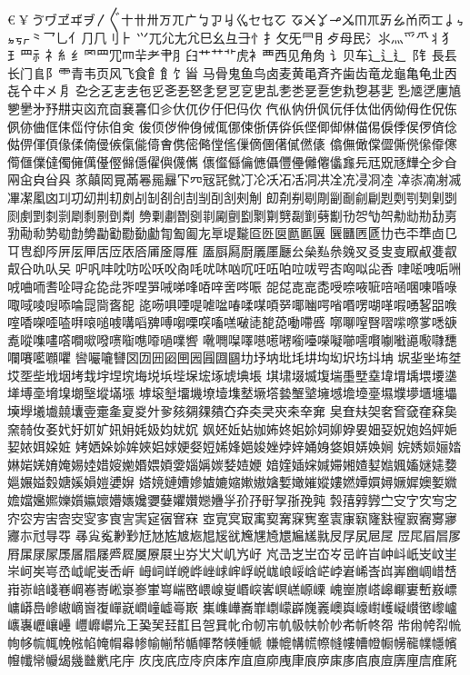 €¥〿ゔヷヹヸヺ〳〴〵〸〹〺ㄪㄫㄬㆠㆡㆢㆣㆤㆥㆦ
ㆧㆨㆩㆪㆫㆬㆭㆮㆯㆰㆱㆲㆳㆴㆵㆶㆷ⺀⺂⺃⺅⺆⺇⺉⺊
⺍⺎⺏⺐⺑⺒⺓⺔⺕⺖⺘⺙⺛⺜⺝⺞⺟⺠⺡⺢⺣⺤⺥⺦⺨
⺩⺫⺬⺭⺯⺰⺱⺲⺴⺵⺸⺹⺺⺼⺽⺾⺿⻀⻁⻂⻃⻄⻅⻆⻇
⻈⻉⻋⻌⻍⻎⻏⻐⻑⻒⻓⻔⻕⻖⻗⻘⻙⻚⻛⻜⻝⻞⻟⻠⻡
⻢⻣⻤⻥⻦⻧⻨⻩⻪⻫⻬⻭⻮⻯⻰⻱⻲⻳㐀㐁㐂㐃㐄㐅㐆
㐇㐈㐉㐊㐋㐌㐍㐎㐏㐐㐑㐒㐓㐔㐕㐖㐗㐘㐙㐚㐛㐜㐝㐞㐟
㐠㐡㐢㐣㐤㐥㐦㐧㐨㐩㐪㐫㐬㐭㐮㐯㐰㐱㐲㐳㐴㐵㐶㐷㐸
㐹㐺㐻㐼㐽㐾㐿㑀㑁㑂㑃㑄㑅㑆㑈㑉㑊㑋㑌㑍㑎㑏㑐㑑㑒
㑓㑔㑕㑖㑗㑘㑙㑚㑛㑜㑝㑞㑟㑠㑡㑢㑣㑤㑥㑦㑧㑨㑩㑪㑫
㑬㑭㑮㑯㑰㑱㑲㑴㑵㑶㑷㑸㑹㑺㑻㑼㑽㑾㑿㒀㒁㒂㒃㒄㒅
㒆㒇㒈㒉㒊㒋㒌㒍㒎㒏㒐㒑㒒㒓㒔㒕㒖㒗㒘㒙㒚㒛㒜㒝㒞
㒟㒠㒡㒢㒣㒤㒥㒦㒧㒨㒩㒪㒫㒬㒭㒮㒯㒰㒱㒲㒳㒴㒵㒶㒷
㒸㒹㒺㒻㒼㒽㒾㒿㓀㓁㓂㓃㓄㓅㓆㓇㓈㓉㓊㓋㓌㓍㓎㓏㓐
㓑㓒㓓㓔㓕㓖㓗㓘㓙㓚㓛㓜㓝㓞㓟㓠㓡㓢㓣㓤㓥㓦㓧㓨㓩
㓪㓫㓬㓭㓮㓯㓰㓱㓲㓳㓴㓵㓶㓷㓸㓹㓺㓻㓼㓽㓾㓿㔀㔁㔂
㔃㔄㔅㔆㔇㔈㔉㔊㔋㔌㔍㔎㔏㔐㔑㔒㔓㔔㔕㔖㔗㔘㔙㔚㔛
㔜㔝㔞㔟㔠㔡㔢㔣㔤㔥㔦㔧㔨㔩㔪㔫㔬㔭㔮㔯㔰㔱㔲㔳㔴
㔵㔶㔷㔸㔹㔺㔻㔼㔽㔾㔿㕀㕁㕂㕃㕄㕅㕆㕇㕈㕉㕊㕋㕌㕍
㕎㕏㕐㕑㕒㕓㕔㕕㕖㕗㕘㕙㕚㕛㕜㕝㕞㕟㕠㕡㕢㕣㕤㕥㕦
㕧㕨㕩㕪㕫㕬㕭㕮㕯㕰㕱㕲㕳㕴㕵㕶㕷㕸㕹㕺㕻㕼㕽㕾㕿
㖀㖁㖂㖃㖄㖅㖆㖇㖈㖉㖊㖋㖌㖍㖎㖏㖐㖑㖒㖓㖔㖕㖖㖗㖘
㖙㖚㖛㖜㖝㖟㖠㖡㖢㖣㖤㖥㖦㖧㖨㖩㖪㖫㖬㖭㖮㖯㖰㖱㖲
㖳㖴㖵㖶㖷㖸㖹㖺㖻㖼㖽㖾㖿㗀㗁㗂㗃㗄㗅㗆㗇㗈㗉㗊㗋
㗌㗍㗎㗏㗐㗑㗒㗓㗔㗕㗖㗗㗘㗙㗚㗛㗜㗝㗞㗟㗠㗡㗢㗣㗤
㗥㗦㗧㗨㗩㗪㗫㗬㗭㗮㗯㗰㗱㗲㗳㗴㗵㗶㗷㗸㗹㗺㗻㗼㗽
㗾㗿㘀㘁㘂㘃㘄㘅㘆㘇㘈㘉㘊㘋㘌㘍㘏㘐㘑㘒㘓㘔㘕㘖㘗
㘘㘙㘛㘜㘝㘞㘟㘠㘡㘢㘣㘤㘥㘦㘧㘨㘩㘪㘫㘬㘭㘮㘯㘰㘱
㘲㘳㘴㘵㘶㘷㘸㘹㘺㘻㘼㘽㘾㘿㙀㙁㙂㙃㙄㙅㙆㙇㙈㙉㙊
㙋㙌㙍㙎㙏㙐㙑㙒㙓㙔㙕㙖㙗㙘㙙㙚㙛㙜㙝㙞㙟㙠㙡㙢㙣
㙤㙥㙦㙧㙨㙩㙪㙫㙬㙭㙮㙯㙰㙱㙲㙳㙴㙵㙶㙷㙸㙹㙺㙻㙼
㙽㙾㙿㚀㚁㚂㚃㚄㚅㚆㚇㚈㚉㚊㚋㚌㚍㚎㚏㚐㚑㚒㚓㚔㚕
㚖㚗㚘㚙㚚㚛㚜㚝㚞㚟㚠㚡㚢㚣㚤㚥㚦㚧㚨㚩㚪㚫㚬㚭㚮
㚯㚰㚱㚲㚳㚴㚵㚶㚷㚸㚹㚺㚻㚼㚽㚾㚿㛀㛁㛂㛃㛄㛅㛆㛇
㛈㛉㛊㛋㛌㛍㛎㛏㛐㛑㛒㛓㛔㛕㛖㛗㛘㛙㛚㛛㛜㛝㛞㛟㛠
㛡㛢㛣㛤㛥㛦㛧㛨㛩㛪㛫㛬㛭㛮㛯㛰㛱㛲㛳㛴㛵㛶㛷㛸㛹
㛺㛻㛼㛽㛾㛿㜀㜁㜂㜃㜄㜅㜆㜇㜈㜉㜊㜋㜌㜍㜎㜏㜐㜑㜒
㜓㜔㜕㜖㜗㜘㜙㜚㜛㜜㜝㜞㜟㜠㜡㜢㜣㜤㜥㜦㜧㜨㜩㜪㜫
㜬㜭㜮㜯㜰㜱㜲㜳㜴㜵㜶㜷㜸㜹㜺㜻㜼㜽㜾㜿㝀㝁㝂㝃㝄
㝅㝆㝇㝈㝉㝊㝋㝌㝍㝎㝏㝐㝑㝒㝓㝔㝕㝖㝗㝘㝙㝚㝛㝜㝝
㝞㝟㝠㝡㝢㝣㝤㝥㝦㝧㝨㝩㝪㝫㝬㝭㝮㝯㝰㝱㝲㝳㝴㝵㝶
㝷㝸㝹㝺㝻㝼㝽㝾㝿㞀㞁㞂㞃㞄㞅㞆㞇㞈㞉㞊㞋㞌㞍㞎㞏
㞐㞑㞒㞓㞔㞕㞖㞗㞘㞙㞚㞛㞜㞝㞞㞟㞠㞡㞢㞣㞤㞥㞦㞧㞨
㞩㞪㞫㞬㞭㞮㞯㞰㞱㞲㞳㞴㞵㞶㞷㞸㞹㞺㞻㞼㞽㞾㞿㟀㟁
㟂㟃㟄㟅㟆㟇㟈㟉㟊㟋㟌㟍㟎㟏㟐㟑㟒㟓㟔㟕㟖㟗㟘㟙㟚
㟛㟜㟝㟞㟟㟠㟡㟢㟣㟤㟥㟦㟧㟨㟩㟪㟫㟬㟭㟮㟯㟰㟱㟲㟳
㟴㟵㟶㟷㟸㟹㟺㟻㟼㟽㟾㟿㠀㠁㠂㠃㠄㠅㠆㠇㠈㠉㠊㠋㠌
㠍㠎㠏㠐㠑㠒㠓㠔㠕㠖㠗㠘㠙㠚㠛㠜㠝㠞㠟㠠㠡㠢㠣㠤㠥
㠦㠧㠨㠩㠪㠫㠬㠭㠮㠯㠰㠱㠲㠳㠴㠵㠶㠷㠸㠹㠺㠻㠼㠽㠾
㠿㡀㡁㡂㡃㡄㡅㡆㡇㡈㡉㡊㡋㡌㡍㡎㡏㡐㡑㡒㡓㡔㡕㡖㡗
㡘㡙㡚㡛㡜㡝㡞㡟㡠㡡㡢㡣㡤㡥㡦㡧㡨㡩㡪㡫㡬㡭㡮㡯㡰
㡱㡲㡳㡴㡵㡶㡷㡸㡹㡺㡻㡼㡽㡾㡿㢀㢁㢂㢃㢄㢅㢆㢇㢈㢉
